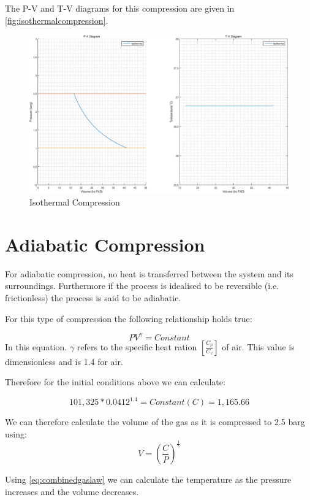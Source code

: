 \documentclass{article}
\begin{document}
The P-V and T-V diagrams for this compression are given in \autoref{fig:isothermalcompression}.

\begin{figure}
\includegraphics[width = \textwidth]{IsothermalCompressionOneStage.eps}
\caption{Isothermal Compression}
\label{fig:isothermalcompression}
\end{figure}

\section{Adiabatic Compression}
For adiabatic compression, no heat is transferred between the system and its surroundings. Furthermore if the process is idealised to be reversible (i.e. frictionless) the process is said to be adiabatic.

For this type of compression the following relationship holds true:

\begin{equation}
PV^{\gamma} = Constant
\end{equation}
In this equation. $\gamma$ refers to the specific heat ration $\left[ \frac{C_{p}}{C_{v}} \right] $ of air. This value is dimensionless and is 1.4 for air.

Therefore for the initial conditions above we can calculate:

\begin{equation}
101,325 * 0.0412^{1.4} = Constant (C) = 1,165.66
\end{equation}

We can therefore calculate the volume of the gas as it is compressed to 2.5 barg using:
\begin{equation}
V = \left( \frac{C}{P} \right) ^{\frac{1}{\gamma}}
\end{equation}

Using \autoref{eq:combinedgaslaw} we can calculate the temperature as the pressure increases and the volume decreases.
\end{document}
